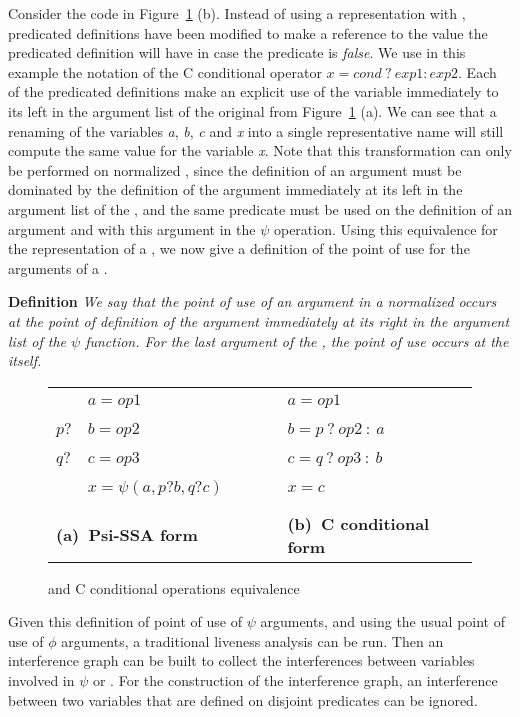 Consider the code in Figure~\ref{fig:psi_ccond} (b). Instead of using
a representation with \psifuns, predicated definitions have
been modified to make a reference to the value the predicated
definition will have in case the predicate is \textit{false}. We use in this
example the notation of the C conditional operator
${x = cond\ ?\ exp1 : exp2}$. Each of the predicated definitions make an
explicit use of the variable immediately to its left in the argument
list of the original \psifun from Figure~\ref{fig:psi_ccond}
(a). We can see that a renaming of the variables \textit{a}, \textit{b},
\textit{c} and \textit{x} into a single representative name will still
compute the same value for the variable \textit{x}. Note that this
transformation can only be performed on normalized \psifuns,
since the definition of an argument must be dominated by the
definition of the argument immediately at its left in the argument
list of the \psifun, and the same predicate must be used on the
 definition of an argument and with this argument in the $\psi$ operation.
Using this equivalence for the
representation of a \psifun, we now give a definition of the
point of use for the arguments of a \psifun.

{\bf Definition} {\em We say that the point of use of an argument in a
  normalized \psifun occurs at the point of definition of the
  argument immediately at its right in the argument list of the $\psi$
  function. For the last argument of the \psifun, the point of
  use occurs at the \psifun itself. }

\begin{figure}
\begin{center}
\footnotesize
\begin{tabular}{llll}
           & ${a = op1}$ & \ \ \ \ & ${a = op1}$ \\
${p?}$ & ${b = op2}$ & \ \ \ \ & ${b = p\ ?\ op2\ :\ a}$ \\
${q?}$ & ${c = op3}$ & \ \ \ \ & ${c = q\ ?\ op3\ :\ b}$ \\
           & ${x = \psi(a,p?b,q?c)}$ & \ \ \ \ & ${x = c}$ \\
\\
\multicolumn{2}{l}{{\bf (a)\ Psi-SSA form}} & \ \ \ \ & {{\bf (b)\ C conditional form}}
\end{tabular}
\caption{\psifuns and C conditional operations equivalence}
\label{fig:psi_ccond}
\end{center}
\end{figure}

Given this definition of point of use of $\psi$ arguments, and using
the usual point of use of $\phi$ arguments, a traditional liveness
analysis can be run. Then an interference graph can be built to
collect the interferences between variables involved in $\psi$ or
\phifuns. For the construction of the interference graph, an
interference between two variables that are defined on disjoint
predicates can be ignored.

